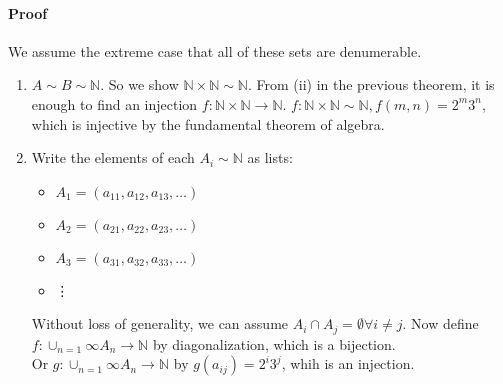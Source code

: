 \documentclass{article}
\newcommand{\mapaB}[2]{{#1}\xrightarrow{}\mathbb{#2}}
\newcommand{\mapAB}[2]{\mathbb{#1}\xrightarrow{}\mathbb{#2}}
\begin{document}
	\paragraph{Proof} We assume the extreme case that all of these sets are denumerable.
	\begin{enumerate}[label=(\roman*)]
		\item $A\sim B\sim\mathbb{N}$. So we show $\mathbb{N}\times\mathbb{N}\sim\mathbb{N}$. From (ii) in the previous theorem, it is enough to find an injection $f:\mapAB{N\times N}{N}$.
		$f:\mathbb{N}\times\mathbb{N}\sim\mathbb{N}, f(m,n)=2^m3^n$, which is injective by the fundamental theorem of algebra.\\
		\item Write the elements of each $A_i\sim\mathbb{N}$ as lists:
		\begin{itemize}[label=]
			\item $A_1 = (a_{11},a_{12},a_{13},\dots)$\\
			\item $A_2 = (a_{21},a_{22},a_{23},\dots)$\\
			\item $A_3 = (a_{31},a_{32},a_{33},\dots)$\\
			\item \vdots
		\end{itemize}
		Without loss of generality, we can assume $A_i\cap A_j=\emptyset \forall i\neq j$. Now define $f:\mapaB{\cup_{n=1}{\infty}A_n}{N}$ by diagonalization, which is a bijection.\\
		Or $g:\mapaB{\cup_{n=1}{\infty}A_n}{N}$ by $g(a_{ij})=2^i3^j$, whih is an injection.
	\end{enumerate}
\end{document}
